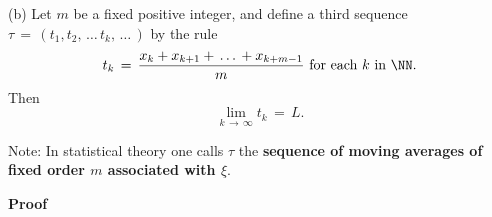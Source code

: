 {\V

        (b) Let $m$ be a fixed positive integer, and define a third sequence ${\tau} \,=\, (t_{1},t_{2},\,{\ldots}\,t_{k},\,{\ldots}\,)$ by the rule
        \begin{displaymath}
        t_{k} \,=\, \frac{x_{k}+x_{k+1}+\,{\ldots}\,+x_{k+m-1}}{m} \mbox{ for each $k$ in ${\NN}$}.
        \end{displaymath}
    Then
        \begin{displaymath}
        \lim_{k \,{\rightarrow}\, {\infty}} t_{k} \,=\, L.
        \end{displaymath}

        Note: In statistical theory one calls ${\tau}$ the {\bf sequence of moving averages of fixed order $m$ associated with ${\xi}$}.

\V

        {\bf Proof}

\V

}
